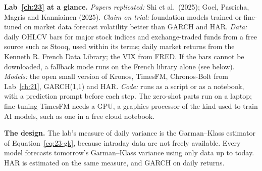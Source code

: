 \begin{callout}
\textbf{Lab~\ref{ch:23} at a glance.} \emph{Papers replicated:} Shi et al.\ (2025); Goel, Pasricha, Magris and Kanniainen (2025). \emph{Claim on trial:} foundation models trained or fine-tuned on market data forecast volatility better than GARCH and HAR. \emph{Data:} daily OHLCV bars for major stock indices and exchange-traded funds from a free source such as Stooq, used within its terms; daily market returns from the Kenneth R. French Data Library; the VIX from FRED. If the bars cannot be downloaded, a fallback mode runs on the French library alone (see below). \emph{Models:} the open small version of Kronos, TimesFM, Chronos-Bolt from Lab~\ref{ch:21}, GARCH(1,1) and HAR. \emph{Code:} runs as a script or as a notebook, with a prediction prompt before each step. The zero-shot parts run on a laptop; fine-tuning TimesFM needs a GPU, a graphics processor of the kind used to train AI models, such as one in a free cloud notebook.
\end{callout}

\textbf{The design.} The lab's measure of daily variance is the Garman--Klass estimator of Equation~\eqref{eq:23-gk}, because intraday data are not freely available. Every model forecasts tomorrow's Garman--Klass variance using only data up to today. HAR is estimated on the same measure, and GARCH on daily returns.

